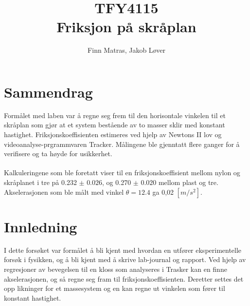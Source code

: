 \documentclass[10pt,a4paper]{report}
\author{Finn Matras, Jakob Løver}
\title{{\LARGE TFY4115}\\{\large Friksjon på skråplan}}
\begin{document}
\renewcommand{\contentsname}{Innhold}
\renewcommand{\cftchapleader}{\cftdotfill{\cftdotsep}}
\renewcommand{\cftpartleader}{\cftdotfill{\cftdotsep}}

\maketitle
\tableofcontents

\chapter*{Sammendrag}
Formålet med laben var å regne seg frem til den horisontale vinkelen til et skråplan som gjør at et system bestående av to masser sklir med konstant hastighet. Friksjonskoeffisienten estimeres ved hjelp av Newtons II lov og videoanalyse-prgrammvaren Tracker. Målingene ble gjenntatt flere ganger for å verifisere og ta høyde for usikkerhet.\\
\\Kalkuleringene som ble foretatt viser til en friksjonskoeffisient mellom nylon og skråplanet i tre på 0.232 $\pm$ $0.026$, og 0.270 $\pm$ $0.020$ mellom plast og tre. Akselerasjonen som ble målt med vinkel $\theta = 12.4$ ga 0,02 $[m/s^2]$.

{\let\clearpage\relax\chapter*{Innledning}}
I dette forsøket var formålet å bli kjent med hvordan en utfører eksperimentelle forsøk i fysikken, og å bli kjent med å skrive lab-journal og rapport. Ved hjelp av regresjoner av bevegelsen til en kloss som analyseres i Trasker kan en finne akselerasjonen, og så regne seg fram til friksjonskoeffisienten. Deretter settes det opp likninger for et massesystem og en kan regne ut vinkelen som fører til konstant hastighet.
\end{document}
